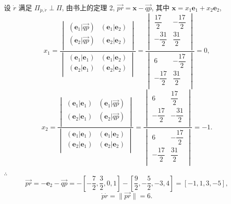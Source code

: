 \documentclass{ctexart}
\begin{document}
\begin{solution}
    设 $\dot{r}$ 满足 $\varPi_{\dot{p},\dot{r}}\perp\varPi$, 由书上的定理 2, $\overrightarrow{pr}=\boldsymbol{x}-\overrightarrow{qp}$, 其中 $\boldsymbol{x}=x_1\boldsymbol{e}_1+x_2\boldsymbol{e}_2$,
    \[x_1=\dfrac{\begin{vmatrix}
        (\boldsymbol{e}_1|\overrightarrow{qp}) & (\boldsymbol{e}_1|\boldsymbol{e}_2) \\
        (\boldsymbol{e}_2|\overrightarrow{qp}) & (\boldsymbol{e}_2|\boldsymbol{e}_2) \\
    \end{vmatrix}}{\begin{vmatrix}
        (\boldsymbol{e}_1|\boldsymbol{e}_1) & (\boldsymbol{e}_1|\boldsymbol{e}_2) \\
        (\boldsymbol{e}_2|\boldsymbol{e}_1) & (\boldsymbol{e}_2|\boldsymbol{e}_2) \\
    \end{vmatrix}}=\dfrac{\begin{vmatrix}
        \dfrac{17}{2} & -\dfrac{17}{2} \\[8pt]
        -\dfrac{31}{2} & \dfrac{31}{2} \\
    \end{vmatrix}}{\begin{vmatrix}
        6 & -\dfrac{17}{2} \\[8pt]
        -\dfrac{17}{2} & \dfrac{31}{2} \\
    \end{vmatrix}}=0,\]
    \[x_2=\dfrac{\begin{vmatrix}
        (\boldsymbol{e}_1|\boldsymbol{e}_1) & (\boldsymbol{e}_1|\overrightarrow{qp}) \\
        (\boldsymbol{e}_2|\boldsymbol{e}_1) & (\boldsymbol{e}_2|\overrightarrow{qp}) \\
    \end{vmatrix}}{\begin{vmatrix}
        (\boldsymbol{e}_1|\boldsymbol{e}_1) & (\boldsymbol{e}_1|\boldsymbol{e}_2) \\
        (\boldsymbol{e}_2|\boldsymbol{e}_1) & (\boldsymbol{e}_2|\boldsymbol{e}_2) \\
    \end{vmatrix}}=\dfrac{\begin{vmatrix}
        6 & \dfrac{17}{2} \\[8pt]
        -\dfrac{17}{2} & -\dfrac{31}{2} \\
    \end{vmatrix}}{\begin{vmatrix}
        6 & -\dfrac{17}{2} \\[8pt]
        -\dfrac{17}{2} & \dfrac{31}{2} \\
    \end{vmatrix}}=-1.\]

    $\therefore$
    \[\overrightarrow{pr}=-\boldsymbol{e}_2-\overrightarrow{qp}=-\left[-\dfrac{7}{2},\dfrac{3}{2},0,1\right]-\left[\dfrac{9}{2},-\dfrac{5}{2},-3,4\right]=[-1,1,3,-5],\]
    \[\dot{p}\dot{r}=\|\overrightarrow{pr}\|=6.\]
\end{solution}
\end{document}
